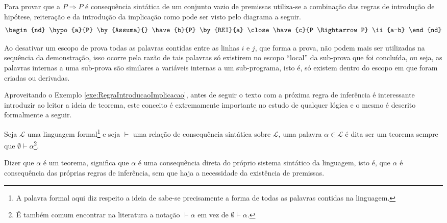 \begin{exemplo}\label{exe:RegraIntroducaoImplicacao}
  Para provar que a $P \Rightarrow P$ é consequência sintática de um conjunto vazio de premissas utiliza-se a combinação das regras de introdução de hipótese, reiteração e da introdução da implicação como pode ser visto pelo diagrama a seguir.
  $$
    \begin{nd}
      \hypo{a}{P} \by{Assuma}{}  
      \have{b}{P} \by{REI}{a}
      \close
      \have{c}{P \Rightarrow P} \ii{a-b}
    \end{nd}
  $$
\end{exemplo}

\begin{cuidado}
  Ao desativar um escopo de prova todas as palavras contidas entre as linhas $i$ e $j$, que forma a prova, não podem mais ser utilizadas na sequência da demonstração, isso ocorre pela razão de tais palavras só existirem no escopo ``local'' da sub-prova que foi concluída, ou seja, as palavras internas a uma sub-prova são similares a variáveis internas a um sub-programa, isto é, só existem dentro do escopo em que foram criadas ou derivadas.
\end{cuidado}

Aproveitando o Exemplo \ref{exe:RegraIntroducaoImplicacao}, antes de seguir o texto com a próxima regra de inferência é interessante introduzir ao leitor a ideia de teorema, este conceito é extremamente importante no estudo de qualquer lógica e o mesmo é descrito formalmente a seguir.

\begin{definicao}[Teorema]
  Seja $\mathcal{L}$ uma linguagem formal\footnote{A palavra formal aqui diz respeito a ideia de sabe-se precisamente a forma de todas as palavras contidas na linguagem.} e seja $\vdash$ uma relação de consequência sintática sobre $\mathcal{L}$, uma palavra $\alpha \in \mathcal{L}$ é dita ser um teorema sempre que $\emptyset \vdash \alpha$\footnote{É também comum encontrar na literatura a notação $\vdash \alpha$ em vez de $\emptyset \vdash \alpha$.}.
\end{definicao}

\begin{nota}
  Dizer que $\alpha$ é um teorema, significa que $\alpha$ é uma consequência direta do próprio sistema sintático da linguagem, isto é, que $\alpha$ é consequência das próprias regras de inferência, sem que haja a necessidade da existência de premissas. 
\end{nota}

